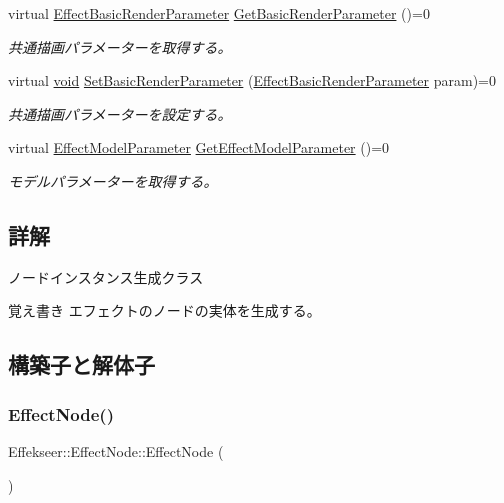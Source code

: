 \begin{DoxyCompactItemize}
virtual \mbox{\hyperlink{struct_effekseer_1_1_effect_basic_render_parameter}{Effect\+Basic\+Render\+Parameter}} \mbox{\hyperlink{class_effekseer_1_1_effect_node_a5066e8209dabdcab46eb5fb64de5180d}{Get\+Basic\+Render\+Parameter}} ()=0
\begin{DoxyCompactList}\small\item\em 共通描画パラメーターを取得する。 \end{DoxyCompactList}\item 
virtual \mbox{\hyperlink{namespace_effekseer_ab34c4088e512200cf4c2716f168deb56}{void}} \mbox{\hyperlink{class_effekseer_1_1_effect_node_a064ec945f4ced3b7935520d625e4c92e}{Set\+Basic\+Render\+Parameter}} (\mbox{\hyperlink{struct_effekseer_1_1_effect_basic_render_parameter}{Effect\+Basic\+Render\+Parameter}} param)=0
\begin{DoxyCompactList}\small\item\em 共通描画パラメーターを設定する。 \end{DoxyCompactList}\item 
virtual \mbox{\hyperlink{struct_effekseer_1_1_effect_model_parameter}{Effect\+Model\+Parameter}} \mbox{\hyperlink{class_effekseer_1_1_effect_node_a6fc47c5de5057a81240d4df22887b2c2}{Get\+Effect\+Model\+Parameter}} ()=0
\begin{DoxyCompactList}\small\item\em モデルパラメーターを取得する。 \end{DoxyCompactList}\end{DoxyCompactItemize}


\subsection{詳解}
ノードインスタンス生成クラス 

\begin{DoxyNote}{覚え書き}
エフェクトのノードの実体を生成する。 
\end{DoxyNote}


\subsection{構築子と解体子}
\mbox{\label{class_effekseer_1_1_effect_node_aba9378c17ee790783c2d2add7ec4c16c}} 
\subsubsection{\texorpdfstring{Effect\+Node()}{EffectNode()}}
{\footnotesize\ttfamily Effekseer\+::\+Effect\+Node\+::\+Effect\+Node (\begin{DoxyParamCaption}{ }\end{DoxyParamCaption})\hspace{0.3cm}{\ttfamily [inline]}}

